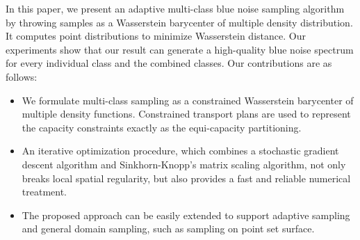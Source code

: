 In this paper, we present an adaptive multi-class blue noise sampling algorithm by
throwing samples as a Wasserstein barycenter of multiple density distribution.
It computes point distributions to minimize Wasserstein distance.
Our experiments show that our result can generate a high-quality blue noise spectrum for every individual class and the combined classes.
Our contributions are as follows:
\begin{itemize}
\item We formulate multi-class sampling as a constrained Wasserstein barycenter of multiple density functions.
Constrained transport plans  are used to represent the capacity constraints exactly as the equi-capacity partitioning.
\item An iterative optimization procedure,
which combines a stochastic gradient descent algorithm and Sinkhorn-Knopp's matrix scaling algorithm,
not only breaks local spatial regularity, but also provides a fast and reliable numerical treatment.
\item The proposed approach can be easily extended to support adaptive sampling and general domain sampling,
such as sampling on point set surface.
\end{itemize}